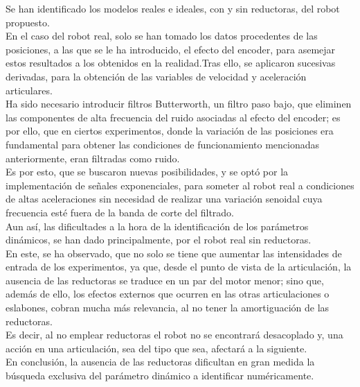 Se han identificado los modelos reales e ideales, con y sin reductoras, del robot propuesto.\\

En el caso del robot real, solo se han tomado los datos procedentes de las posiciones, a las que se le ha introducido, el efecto del encoder, para asemejar estos resultados a los obtenidos en la realidad.Tras ello, se aplicaron sucesivas derivadas, para la obtención de las variables de velocidad y aceleración articulares.\\



Ha sido necesario introducir filtros Butterworth, un filtro paso bajo, que eliminen las componentes de alta frecuencia del ruido asociadas al efecto del encoder; es por ello, que en ciertos experimentos, donde la variación de las posiciones era fundamental para obtener las condiciones de funcionamiento mencionadas anteriormente, eran filtradas como ruido. \\

Es por esto, que se buscaron nuevas posibilidades, y se optó por la implementación de señales exponenciales, para someter al robot real a condiciones de altas aceleraciones sin necesidad de realizar una variación senoidal cuya frecuencia esté fuera de la banda de corte del filtrado.\\



Aun así, las dificultades a la hora de la identificación de los parámetros dinámicos, se han dado principalmente, por el robot real sin reductoras.\\

En este, se ha observado, que no solo se tiene que aumentar las intensidades de entrada de los experimentos, ya que, desde el punto de vista de la articulación, la ausencia de las reductoras se traduce en un par del motor menor; sino que, además de ello, los efectos externos que ocurren en las otras articulaciones o eslabones, cobran mucha más relevancia, al no tener la amortiguación de las reductoras. \\

Es decir, al no emplear reductoras el robot no se encontrará desacoplado y, una acción en una articulación, sea del tipo que sea, afectará a la siguiente.\\

En conclusión, la ausencia de las reductoras dificultan en gran medida la búsqueda exclusiva del parámetro dinámico a identificar numéricamente.\\



